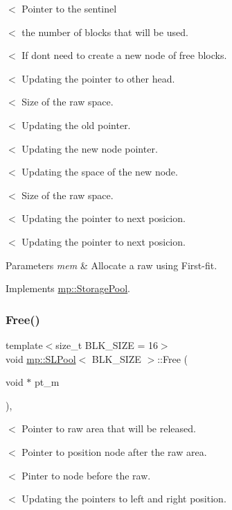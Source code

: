 $<$ Pointer to the sentinel

$<$ the number of blocks that will be used.

$<$ If dont need to create a new node of free blocks.

$<$ Updating the pointer to other head.

$<$ Size of the raw space.

$<$ Updating the old pointer.

$<$ Updating the new node pointer.

$<$ Updating the space of the new node.

$<$ Size of the raw space.

$<$ Updating the pointer to next posicion.

$<$ Updating the pointer to next posicion. 
\begin{DoxyParams}{Parameters}
{\em mem} & Allocate a raw using First-\/fit. \\
\hline
\end{DoxyParams}


Implements \hyperlink{classmp_1_1_storage_pool_a7970f46f34c0e532544888ecaf10b4c9}{mp\+::\+Storage\+Pool}.

\mbox{\label{classmp_1_1_s_l_pool_a605b83d9042098aabaf19e3796222a74}} 
\subsubsection{\texorpdfstring{Free()}{Free()}}
{\footnotesize\ttfamily template$<$size\+\_\+t B\+L\+K\+\_\+\+S\+I\+ZE = 16$>$ \\
void \hyperlink{classmp_1_1_s_l_pool}{mp\+::\+S\+L\+Pool}$<$ B\+L\+K\+\_\+\+S\+I\+ZE $>$\+::Free (\begin{DoxyParamCaption}\item[{void $\ast$}]{pt\+\_\+m }\end{DoxyParamCaption})\hspace{0.3cm}{\ttfamily [inline]}, {\ttfamily [virtual]}}

$<$ Pointer to raw area that will be released.

$<$ Pointer to position node after the raw area.

$<$ Pinter to node before the raw.

$<$ Updating the pointers to left and right position.

